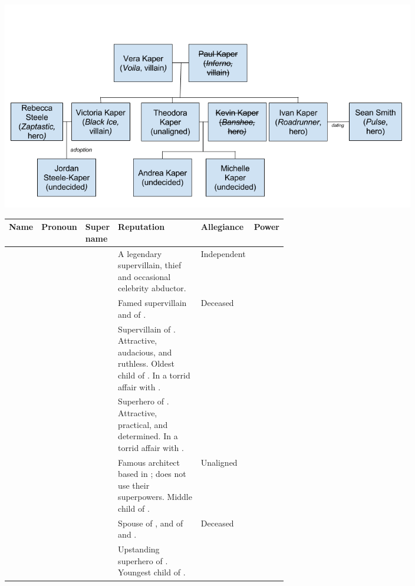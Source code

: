 \documentclass[blue]{LRSguildcamp1}
\begin{document}
\includegraphics[width=0.8\textwidth]{Familytree.png}
\\
\begin{tabular}{l|l|l|p{0.35\linewidth}|p{0.1\linewidth}|p{0.1\linewidth}}
{\bf Name} & {\bf Pronoun} & {\bf Super name} & {\bf Reputation} & {\bf Allegiance} & {\bf Power} \\ \hline
\cGrandma{\intro} & \cGrandma{\they} & \cGrandma{\MYsupername} & A legendary supervillain, thief and occasional celebrity abductor. & Independent \cGrandma{\villain} & 
\cGrandma{\MYsuperpower} \\ \hline
\cGS{\intro} & \cGS{\they} & \cGS{\MYsupername} & Famed supervillain and \cGS{\spouse} of \cGrandma{}.  & Deceased \cGS{\villain} & \cGS{\MYsuperpower} \\ \hline
\cOldest{\intro} & \cOldest{\they} & \cOldest{\MYsupername} & Supervillain of \pCityO{}. Attractive, audacious, and ruthless.  Oldest child of \cGrandma{\intro}. In a torrid affair with \cOS{}. & \cVillainCompact{\intro} & \cOldest{\MYsuperpower} \\ \hline
\cOS{\intro} & \cOS{\they} & \cOS{\MYsupername} &  Superhero of \pCityO{}.  Attractive, practical, and determined.  In a torrid affair with \cOldest{}. & \cHeroLeague{\intro} & \cOS{\MYsuperpower} \\ \hline
\cArchitect{\intro} & \cArchitect{\they} & \cArchitect{\MYsupername} & Famous architect based in \pCityArchitect{}; does not use their superpowers.  Middle child of \cGrandma{\intro}. & Unaligned & \cArchitect{\MYsuperpower} \\ \hline
\cAS{\intro} & \cAS{\they} & \cAS{\MYsupername} & Spouse of \cArchitect{\intro}, and \cAS{\parent} of \cTeen{} and \cTween{}.  & Deceased \cAS{\hero} & \cAS{\MYsuperpower} \\ \hline
\cYoungest{\intro} & \cYoungest{\they} & \cYoungest{\MYsupername} & Upstanding superhero of \pCityYoungest{}.  Youngest child of \cGrandma{}. & \cHeroLeague{\intro} & \cYoungest{\MYsuperpower} \\ \hline

\end{tabular}
\end{document}
